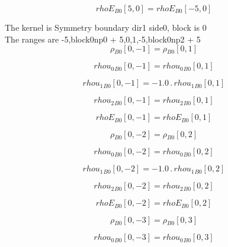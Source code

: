 \documentclass{article}
\begin{document}
\begin{dmath}{rhoE{_{B0}}}[{5,0}] = {rhoE{_{B0}}}[{-5,0}]\end{dmath}

\noindent The kernel is Symmetry boundary dir1 side0, block is 0\\\noindent The ranges are -5,block0np0 + 5,0,1,-5,block0np2 + 5\\\begin{dmath}{\rho{_{B0}}}[{0,-1}] = {\rho{_{B0}}}[{0,1}]\end{dmath}

\begin{dmath}{rhou_{0}{_{B0}}}[{0,-1}] = {rhou_{0}{_{B0}}}[{0,1}]\end{dmath}

\begin{dmath}{rhou_{1}{_{B0}}}[{0,-1}] = - 1.0 \,.\, {rhou_{1}{_{B0}}}[{0,1}]\end{dmath}

\begin{dmath}{rhou_{2}{_{B0}}}[{0,-1}] = {rhou_{2}{_{B0}}}[{0,1}]\end{dmath}

\begin{dmath}{rhoE{_{B0}}}[{0,-1}] = {rhoE{_{B0}}}[{0,1}]\end{dmath}

\begin{dmath}{\rho{_{B0}}}[{0,-2}] = {\rho{_{B0}}}[{0,2}]\end{dmath}

\begin{dmath}{rhou_{0}{_{B0}}}[{0,-2}] = {rhou_{0}{_{B0}}}[{0,2}]\end{dmath}

\begin{dmath}{rhou_{1}{_{B0}}}[{0,-2}] = - 1.0 \,.\, {rhou_{1}{_{B0}}}[{0,2}]\end{dmath}

\begin{dmath}{rhou_{2}{_{B0}}}[{0,-2}] = {rhou_{2}{_{B0}}}[{0,2}]\end{dmath}

\begin{dmath}{rhoE{_{B0}}}[{0,-2}] = {rhoE{_{B0}}}[{0,2}]\end{dmath}

\begin{dmath}{\rho{_{B0}}}[{0,-3}] = {\rho{_{B0}}}[{0,3}]\end{dmath}

\begin{dmath}{rhou_{0}{_{B0}}}[{0,-3}] = {rhou_{0}{_{B0}}}[{0,3}]\end{dmath}
\end{document}
